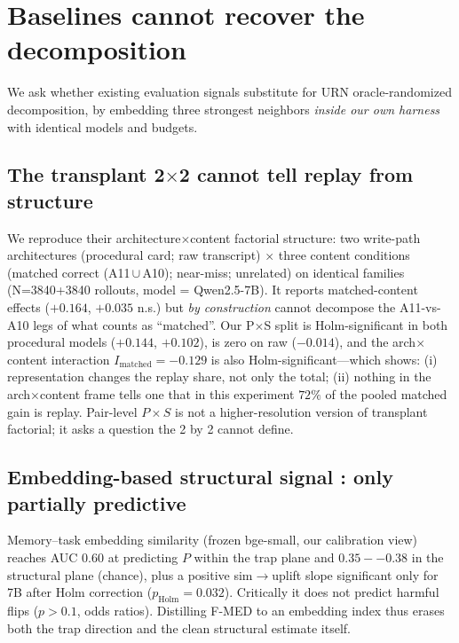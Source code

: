 \section{Baselines cannot recover the decomposition}
\label{sec:gatec}

We ask whether existing evaluation signals substitute for URN oracle-randomized decomposition, by embedding three strongest neighbors \emph{inside our own harness} with identical models and budgets.

\subsection{The transplant 2$\times$2 \citep{feng2026transplants} cannot tell replay from structure}
\label{ssec:transplants}

We reproduce their architecture$\times$content factorial structure: two write-path architectures (procedural card; raw transcript) $\times$ three content conditions (matched correct (A11\,$\cup$\,A10); near-miss; unrelated) on identical families (N=3840+3840 rollouts, model = Qwen2.5-7B). It reports matched-content effects ($+0.164$, $+0.035$ n.s.) but \emph{by construction} cannot decompose the A11-vs-A10 legs of what counts as ``matched''. Our P$\times$S split is Holm-significant in both procedural models ($+0.144$, $+0.102$), is zero on raw ($-0.014$), and the arch$\times$content interaction $I_{\mathrm{matched}}=-0.129$ is also Holm-significant---which shows: (i) representation changes the replay share, not only the total; (ii) nothing in the arch$\times$content frame tells one that in this experiment $72\%$ of the pooled matched gain is replay. Pair-level $P\times S$ is not a higher-resolution version of transplant factorial; it asks a question the 2 by 2 cannot define.

\subsection{Embedding-based structural signal \citep{procedmem2025}: only partially predictive}
\label{ssec:procedmem}

Memory--task embedding similarity (frozen bge-small, our calibration view) reaches AUC $0.60$ at predicting $P$ within the trap plane and $0.35--0.38$ in the structural plane (chance), plus a positive sim$\to$uplift slope significant only for 7B after Holm correction ($p_{\mathrm{Holm}}=0.032$). Critically it does not predict harmful flips ($p>0.1$, odds ratios). Distilling F-MED to an embedding index thus erases both the trap direction and the clean structural estimate itself.

